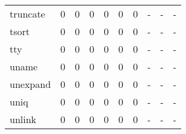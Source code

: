 \begin{longtable}{lp{2.0cm}p{2.0cm}p{2.0cm}p{2.0cm}p{2.0cm}p{2.0cm}p{2.0cm}p{2.0cm}p{2.0cm}}
truncate  &                      0 &                                  0 &                                 0 &                                0 &                                 0 &                               0 &                                    - &                                      - &                                    - \\
tsort     &                      0 &                                  0 &                                 0 &                                0 &                                 0 &                               0 &                                    - &                                      - &                                    - \\
tty       &                      0 &                                  0 &                                 0 &                                0 &                                 0 &                               0 &                                    - &                                      - &                                    - \\
uname     &                      0 &                                  0 &                                 0 &                                0 &                                 0 &                               0 &                                    - &                                      - &                                    - \\
unexpand  &                      0 &                                  0 &                                 0 &                                0 &                                 0 &                               0 &                                    - &                                      - &                                    - \\
uniq      &                      0 &                                  0 &                                 0 &                                0 &                                 0 &                               0 &                                    - &                                      - &                                    - \\
unlink    &                      0 &                                  0 &                                 0 &                                0 &                                 0 &                               0 &                                    - &                                      - &                                    - \\

\end{longtable}
